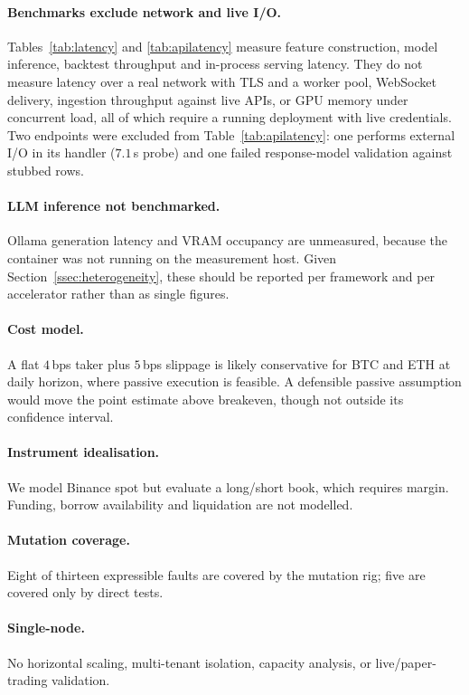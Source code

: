 \documentclass[preprint,12pt,authoryear]{elsarticle}
\begin{document}
\paragraph{Benchmarks exclude network and live I/O.} Tables~\ref{tab:latency}
and \ref{tab:apilatency} measure feature construction, model inference, backtest
throughput and in-process serving latency. They do not measure latency over a
real network with TLS and a worker pool, WebSocket delivery, ingestion
throughput against live APIs, or GPU memory under concurrent load, all of which
require a running deployment with live credentials. Two endpoints were excluded
from Table~\ref{tab:apilatency}: one performs external I/O in its handler
($7.1$\,s probe) and one failed response-model validation against stubbed rows.

\paragraph{LLM inference not benchmarked.} Ollama generation latency and VRAM
occupancy are unmeasured, because the container was not running on the
measurement host. Given Section~\ref{ssec:heterogeneity}, these should be
reported per framework and per accelerator rather than as single figures.

\paragraph{Cost model.} A flat $4$\,bps taker plus $5$\,bps slippage is likely
conservative for BTC and ETH at daily horizon, where passive execution is
feasible. A defensible passive assumption would move the point estimate above
breakeven, though not outside its confidence interval.

\paragraph{Instrument idealisation.} We model Binance spot but evaluate a
long/short book, which requires margin. Funding, borrow availability and
liquidation are not modelled.

\paragraph{Mutation coverage.} Eight of thirteen expressible faults are covered
by the mutation rig; five are covered only by direct tests.

\paragraph{Single-node.} No horizontal scaling, multi-tenant isolation, capacity
analysis, or live/paper-trading validation.
\end{document}
